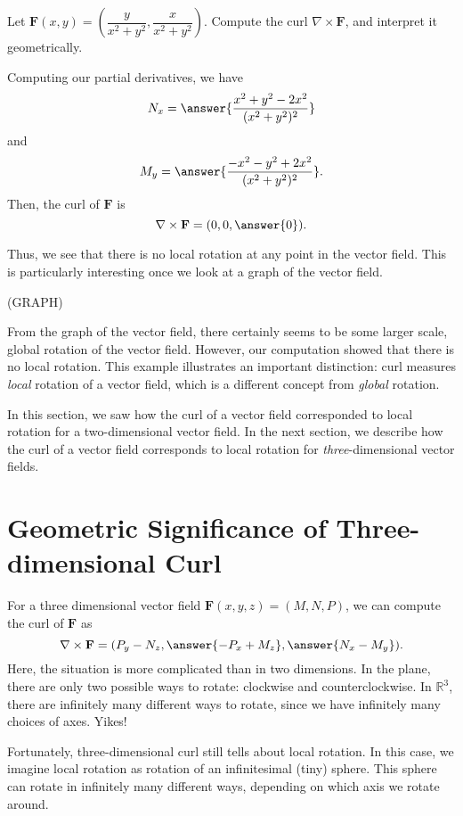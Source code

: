 \documentclass{ximera}
\begin{document}
\begin{example}
Let $\mathbf{F}(x,y)=\left(\dfrac{y}{x^2+y^2},\dfrac{x}{x^2+y^2}\right)$. Compute the curl $\nabla\times\mathbf{F}$, and interpret it geometrically.
\begin{explanation}
Computing our partial derivatives, we have
\[
N_x = \answer{\frac{x^2+y^2-2x^2}{(x^2+y^2)^2}}
\]
and 
\[
M_y = \answer{\frac{-x^2-y^2+2x^2}{(x^2+y^2)^2}}.
\]
Then, the curl of $\mathbf{F}$ is
\[
\nabla\times\mathbf{F} = (0,0,\answer{0}).
\]

Thus, we see that there is no local rotation at any point in the vector field. This is particularly interesting once we look at a graph of the vector field.

(GRAPH)

From the graph of the vector field, there certainly seems to be some larger scale, global rotation of the vector field. However, our computation showed that there is no local rotation. This example illustrates an important distinction: curl measures \emph{local} rotation of a vector field, which is a different concept from \emph{global} rotation.
\end{explanation}
\end{example}

In this section, we saw how the curl of a vector field corresponded to local rotation for a two-dimensional vector field. In the next section, we describe how the curl of a vector field corresponds to local rotation for \emph{three}-dimensional vector fields.

\section{Geometric Significance of Three-dimensional Curl}

For a three dimensional vector field $\mathbf{F}(x,y,z)=(M,N,P)$, we can compute the curl of $\mathbf{F}$ as
\[
\nabla\times \mathbf{F} = (P_y-N_z, \answer{-P_x+M_z},\answer{N_x-M_y}).
\]
Here, the situation is more complicated than in two dimensions. In the plane, there are only two possible ways to rotate: clockwise and counterclockwise. In $\mathbb{R}^3$, there are infinitely many different ways to rotate, since we have infinitely many choices of axes. Yikes!

Fortunately, three-dimensional curl still tells about local rotation. In this case, we imagine local rotation as rotation of an infinitesimal (tiny) sphere. This sphere can rotate in infinitely many different ways, depending on which axis we rotate around.
\end{document}
